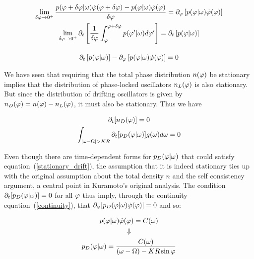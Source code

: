 \begin{gather}
    \lim_{\delta\varphi \to 0^+} \frac{p(\varphi+\delta\varphi | \omega)\dot{\varphi}(\varphi+\delta\varphi) - p(\varphi | \omega)\dot{\varphi}(\varphi)}{\delta\varphi} = \partial_\varphi \left[ p(\varphi | \omega) \dot{\varphi}(\varphi) \right]  \notag\\
    \lim_{\delta\varphi \to 0^+} \partial_t \left[ \frac{1}{\delta\varphi}\int_{\varphi}^{\varphi + \delta \varphi} p(\varphi' | \omega) d\varphi' \right] = \partial_t \left[ p(\varphi | \omega) \right] \notag\\[10pt]
    \partial_t \left[ p(\varphi | \omega) \right] - \partial_\varphi \left[ p(\varphi | \omega) \dot{\varphi}(\varphi) \right] = 0
    \label{continuity}
\end{gather}

We have seen that requiring that the total phase distribution $n(\varphi)$ be stationary implies that the distribution of
phase-locked oscillators $n_L(\varphi)$ is also stationary. But since the distribution of drifting oscillators is given by
$n_D(\varphi) = n(\varphi) - n_L(\varphi)$, it must also be stationary. Thus we have

\begin{gather}
    \partial_t [ n_D(\varphi) ] = 0\notag\\
    \int_{|\omega - \Omega| > K R} \partial_t [ p_D(\varphi | \omega)] g(\omega) d\omega = 0
    \label{stationary_drift}
\end{gather}

Even though there are time-dependent forms for $p_D(\varphi | \omega)$ that could satisfy equation~(\ref{stationary_drift}), the
assumption that it is indeed stationary ties up with the original assumption about the total density $n$ and the self consistency
argument, a central point in Kuramoto's original analysis. The condition $\partial_t [p_D(\varphi | \omega)]=0$ for all $\varphi$
thus imply, through the continuity equation~(\ref{continuity}), that $\partial_\varphi [p_D(\varphi |
\omega)\dot{\varphi}(\varphi)]=0$ and so:

\begin{gather}
    p(\varphi | \omega) \dot{\varphi}(\varphi) = C(\omega) \notag\\
    \Downarrow \notag\\
    p_D(\varphi | \omega) = \frac{C(\omega)}{(\omega - \Omega) - K R \sin \varphi}
    \label{nD}
\end{gather}

